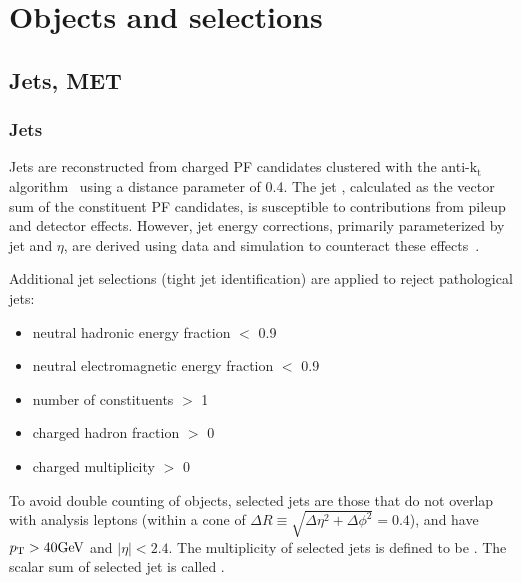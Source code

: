 \chapter{Objects and selections}

\section{Jets, MET}

\subsection{Jets}
Jets are reconstructed from charged PF candidates clustered with the
anti-$\mathrm{k_t}$ algorithm~\cite{CMS:Cacciari2008gp, CMS:Cacciari2011ma}
using a distance parameter of 0.4. The jet \pt, calculated as the vector sum
of the constituent PF candidates, is susceptible to contributions from pileup
and detector effects. However, jet energy corrections, primarily
parameterized by jet \pt and $\eta$, are derived using data and simulation to
counteract these effects~\cite{CMS:Khachatryan2016kdb, CMS:PASJME16003}.

Additional jet selections (tight jet identification) are applied to reject
pathological jets:
\begin{itemize}
    \item neutral hadronic energy fraction $<$ 0.9
    \item neutral electromagnetic energy fraction $<$ 0.9
    \item number of constituents $>$ 1
    \item charged hadron fraction $>$ 0
    \item charged multiplicity $>$ 0
\end{itemize}

To avoid double counting of objects,
selected jets are those that do not overlap with analysis leptons 
(within a cone of $\Delta R \equiv \sqrt{\Delta\eta^2 + \Delta\phi^2} = 0.4$),
and have $p_{\mathrm{T}}>40\text{GeV}$ and $|\eta|<2.4$. The multiplicity of selected jets
is defined to be \Njets. The scalar sum of selected jet \pt
is called \HT.

